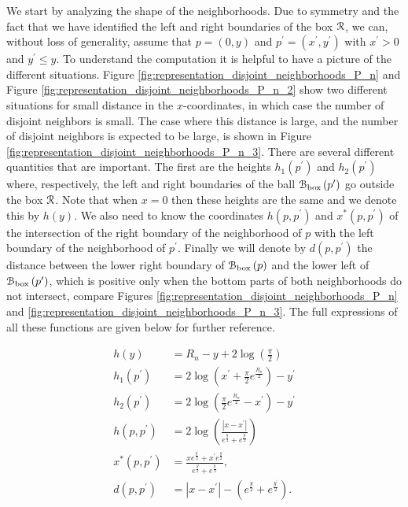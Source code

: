 We start by analyzing the shape of the neighborhoods. Due to symmetry and the fact that we have identified the left and right boundaries of the box ${\mathcal R}$, we can, without loss of generality, assume that $p = (0,y)$ and $p^\prime = (x^\prime,y^\prime)$ with $x^\prime > 0$ and $y^\prime \le y$. To understand the computation it is helpful to have a picture of the different situations. Figure \ref{fig:representation_disjoint_neighborhoods_P_n} and Figure \ref{fig:representation_disjoint_neighborhoods_P_n_2} show two different situations for small distance in the $x$-coordinates, in which case the number of disjoint neighbors is small. The case where this distance is large, and the number of disjoint neighbors is expected to be large, is shown in Figure \ref{fig:representation_disjoint_neighborhoods_P_n_3}. There are several different quantities that are important. The first are the heights $h_1(p^\prime)$ and $h_2(p^\prime)$ where, respectively, the left and right boundaries of the ball ${\mathcal B}_{\text{box}}\left(p^\prime\right)$ go outside the box ${\mathcal R}$. Note that when $x = 0$ then these heights are the same and we denote this by $h(y)$. We also need to know the coordinates $h(p,p^\prime)$ and $x^\ast(p,p^\prime)$ of the intersection of the right boundary of the neighborhood of $p$ with the left boundary of the neighborhood of $p^\prime$. Finally we will denote by $d(p,p^\prime)$ the distance between the lower right boundary of ${\mathcal B}_{\text{box}}\left(p\right)$ and the lower left of ${\mathcal B}_{\text{box}}\left(p^\prime\right)$, which is positive only when the bottom parts of both neighborhoods do not intersect, compare Figures \ref{fig:representation_disjoint_neighborhoods_P_n} and \ref{fig:representation_disjoint_neighborhoods_P_n_3}. The full expressions of all these functions are given below for further reference.

\begin{align}
	h(y) &= R_n - y + 2\log\left(\frac{\pi}{2}\right) \label{eq:def_height_y_P_n}\\
	h_1(p^\prime) &= 2\log\left(x^\prime + \frac{\pi}{2}e^{\frac{R_n}{2}}\right) - y^\prime \label{eq:def_height_left_P_n} \\
	h_2(p^\prime) &= 2\log\left(\frac{\pi}{2}e^{\frac{R_n}{2}} - x^\prime\right) - y^\prime 
		\label{eq:def_height_right_P_n} \\
	h(p,p^\prime) &= 2\log\left(\frac{|x - x^\prime|}{e^{\frac{y}{2}} + e^{\frac{y^\prime}{2}}}\right)\\
	x^\ast(p,p^\prime) &= \frac{x e^{\frac{y^\prime}{2}} + x^\prime e^{\frac{y}{2}}}{e^{\frac{y}{2}} + 	
		e^{\frac{y^\prime}{2}}},\\
	d(p,p^\prime) &= |x - x^\prime| - \left(e^{\frac{y}{2}} + e^{\frac{y^\prime}{2}}\right).
	\label{eq:def_d_p_p_prime}
\end{align}

